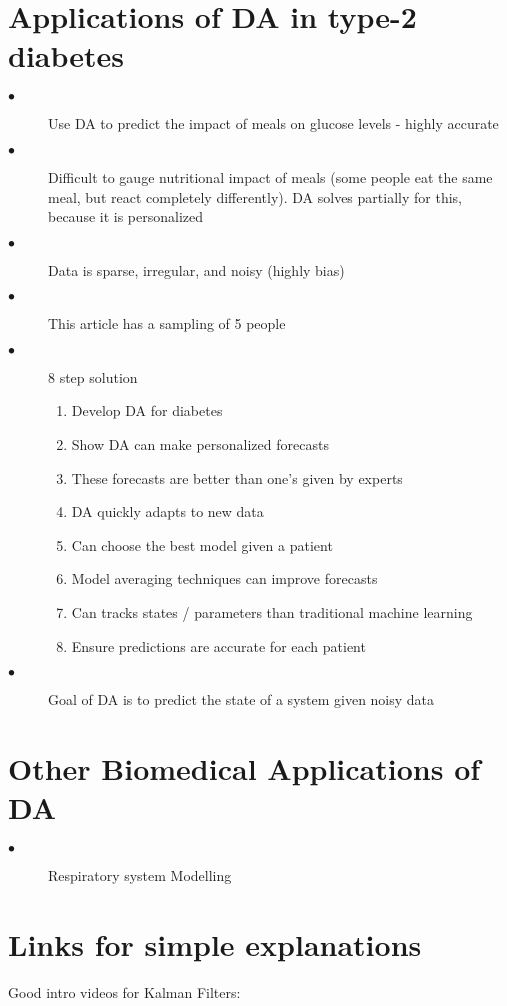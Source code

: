 \documentclass{article}
\begin{document}
\section{Applications of DA in type-2 diabetes}
\begin{description}
  \item[$\bullet$] Use DA to predict the impact of meals on glucose levels - highly accurate
  \item[$\bullet$] Difficult to gauge nutritional impact of meals (some people eat the same meal, but react completely differently). DA solves partially for this, because it is personalized
  \item[$\bullet$] Data is sparse, irregular, and noisy (highly bias)
  \item[$\bullet$] This article has a sampling of 5 people
  \item[$\bullet$] 8 step solution
    \begin{enumerate}
        \item Develop DA for diabetes
        \item Show DA can make personalized forecasts
        \item These forecasts are better than one's given by experts
        \item DA quickly adapts to new data
        \item Can choose the best model given a patient
        \item Model averaging techniques can improve forecasts
        \item Can tracks states / parameters than traditional machine learning
        \item Ensure predictions are accurate for each patient
    \end{enumerate}
    \item[$\bullet$] Goal of DA is to predict the state of a system given noisy data
\end{description} \cite{Albers2017PersonalizedGF}


\section{Other Biomedical Applications of DA}
\begin{description}
\item[$\bullet$] Respiratory system Modelling \cite{inbook} 
\end{description}




\section{Links for simple explanations}
Good intro videos for Kalman Filters: 







\end{document}
